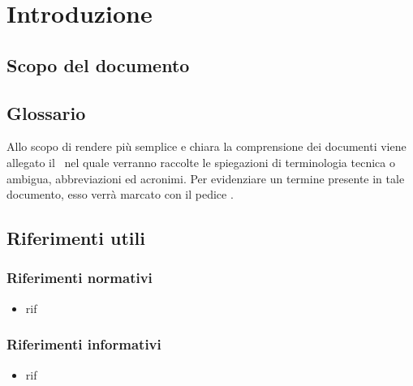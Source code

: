 \documentclass[../SpecificaTecnica.tex]{subfiles}
\begin{document}
\section{Introduzione}
	\subsection{Scopo del documento}
	
	\subsection{Glossario} \label{sec:Glossario}
	Allo scopo di rendere più semplice e chiara la comprensione dei documenti viene allegato il \glossariov\ nel quale verranno raccolte le spiegazioni di  terminologia tecnica o  ambigua,
	abbreviazioni ed acronimi. Per evidenziare un termine presente in tale documento, esso verrà marcato con il pedice \g.
	\subsection{Riferimenti utili}
		\subsubsection{Riferimenti normativi}
		\begin{itemize}
			\item rif
		\end{itemize}
		\subsubsection{Riferimenti informativi}
		\begin{itemize}
			\item rif
		\end{itemize}
\end{document}
